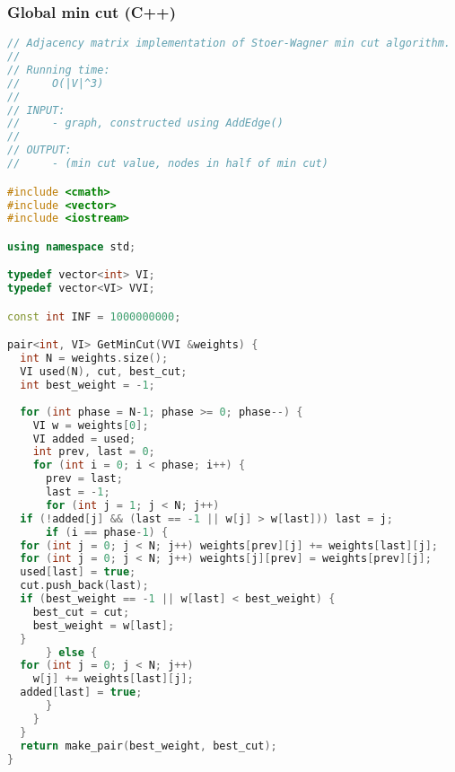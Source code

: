 \subsubsection{Global min cut (C++)}
\begin{lstlisting}[language=C++]
// Adjacency matrix implementation of Stoer-Wagner min cut algorithm.
//
// Running time:
//     O(|V|^3)
//
// INPUT: 
//     - graph, constructed using AddEdge()
//
// OUTPUT:
//     - (min cut value, nodes in half of min cut)

#include <cmath>
#include <vector>
#include <iostream>

using namespace std;

typedef vector<int> VI;
typedef vector<VI> VVI;

const int INF = 1000000000;

pair<int, VI> GetMinCut(VVI &weights) {
  int N = weights.size();
  VI used(N), cut, best_cut;
  int best_weight = -1;
  
  for (int phase = N-1; phase >= 0; phase--) {
    VI w = weights[0];
    VI added = used;
    int prev, last = 0;
    for (int i = 0; i < phase; i++) {
      prev = last;
      last = -1;
      for (int j = 1; j < N; j++)
  if (!added[j] && (last == -1 || w[j] > w[last])) last = j;
      if (i == phase-1) {
  for (int j = 0; j < N; j++) weights[prev][j] += weights[last][j];
  for (int j = 0; j < N; j++) weights[j][prev] = weights[prev][j];
  used[last] = true;
  cut.push_back(last);
  if (best_weight == -1 || w[last] < best_weight) {
    best_cut = cut;
    best_weight = w[last];
  }
      } else {
  for (int j = 0; j < N; j++)
    w[j] += weights[last][j];
  added[last] = true;
      }
    }
  }
  return make_pair(best_weight, best_cut);
}

\end{lstlisting}
